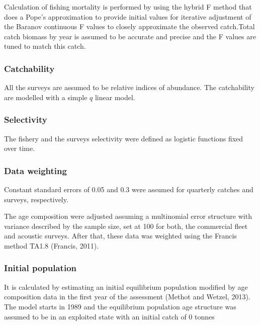 \documentclass[
]{article}
\begin{document}
Calculation of fishing mortality is performed by using the hybrid F
method that does a Pope's approximation to provide initial values for
iterative adjustment of the Baranov continuous F values to closely
approximate the observed catch.Total catch biomass by year is assumed to
be accurate and precise and the F values are tuned to match this catch.

\hypertarget{catchability}{%
\subsubsection{Catchability}\label{catchability}}

All the surveys are assumed to be relative indices of abundance. The
catchability are modelled with a simple \(q\) linear model.

\hypertarget{selectivity}{%
\subsubsection{Selectivity}\label{selectivity}}

The fishery and the surveys selectivity were defined as logistic
functions fixed over time.

\hypertarget{data-weighting}{%
\subsubsection{Data weighting}\label{data-weighting}}

Constant standard errors of 0.05 and 0.3 were assumed for quarterly
catches and surveys, respectively.

The age composition were adjusted assuming a multinomial error structure
with variance described by the sample size, set at 100 for both, the
commercial fleet and acoustic surveys. After that, these data was
weighted using the Francis method TA1.8 (Francis, 2011).

\hypertarget{initial-population}{%
\subsubsection{Initial population}\label{initial-population}}

It is calculated by estimating an initial equilibrium population
modified by age composition data in the first year of the assessment
(Methot and Wetzel, 2013). The model starts in 1989 and the equilibrium
population age structure was assumed to be in an exploited state with an
initial catch of 0 tonnes
\end{document}
